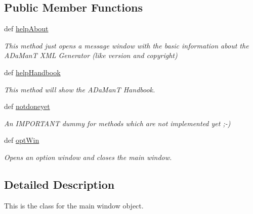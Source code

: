 \subsection*{Public Member Functions}
\begin{DoxyCompactItemize}
\item 
\hypertarget{classgui_1_1window2_1_1MainWindow_ad4f4bbba4c4a628d0a35195b093d6049}{def \hyperlink{classgui_1_1window2_1_1MainWindow_ad4f4bbba4c4a628d0a35195b093d6049}{help\-About}}\label{classgui_1_1window2_1_1MainWindow_ad4f4bbba4c4a628d0a35195b093d6049}

\begin{DoxyCompactList}\small\item\em This method just opens a message window with the basic information about the A\-Da\-Man\-T X\-M\-L Generator (like version and copyright) \end{DoxyCompactList}\item 
def \hyperlink{classgui_1_1window2_1_1MainWindow_a784d15d1157ea5b181c63d73daa3fc5e}{help\-Handbook}
\begin{DoxyCompactList}\small\item\em This method will show the A\-Da\-Man\-T Handbook. \end{DoxyCompactList}\item 
\hypertarget{classgui_1_1window2_1_1MainWindow_a615f3073891733337c33f599f89ec7ef}{def \hyperlink{classgui_1_1window2_1_1MainWindow_a615f3073891733337c33f599f89ec7ef}{notdoneyet}}\label{classgui_1_1window2_1_1MainWindow_a615f3073891733337c33f599f89ec7ef}

\begin{DoxyCompactList}\small\item\em An I\-M\-P\-O\-R\-T\-A\-N\-T dummy for methods which are not implemented yet ;-\/) \end{DoxyCompactList}\item 
\hypertarget{classgui_1_1window2_1_1MainWindow_a2cc0c3d64b049aac95bc9fdbb9673050}{def \hyperlink{classgui_1_1window2_1_1MainWindow_a2cc0c3d64b049aac95bc9fdbb9673050}{opt\-Win}}\label{classgui_1_1window2_1_1MainWindow_a2cc0c3d64b049aac95bc9fdbb9673050}

\begin{DoxyCompactList}\small\item\em Opens an option window and closes the main window. \end{DoxyCompactList}\end{DoxyCompactItemize}


\subsection{Detailed Description}
This is the class for the main window object. 


